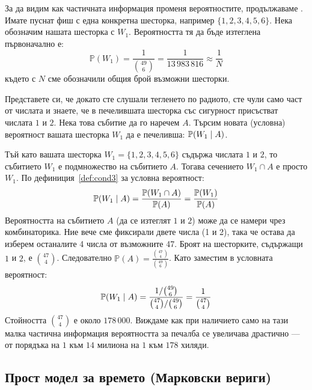 \begin{example}[Тото 6 от 49]\label{ex:03-1}

За да видим как частичната информация променя вероятностите, продължаваме . Имате пуснат фиш с една конкретна шесторка, например $\{1, 2, 3, 4, 5, 6\}$. Нека обозначим нашата шесторка с $W_1$.
Вероятността тя да бъде изтеглена първоначално е:
\[
\mathbb{P}(W_1) = \frac{1}{\binom{49}{6}} = \frac{1}{13\,983\,816} \approx \frac{1}{N}
\]
където с $N$ сме обозначили общия брой възможни шесторки.

Представете си, че докато сте слушали тегленето по радиото, сте чули само част от числата и знаете, че в печелившата шесторка със сигурност присъстват числата $1$ и $2$. Нека това събитие да го наречем $A$. Търсим новата (условна) вероятност вашата шесторка $W_1$ да е печеливша: $\mathbb{P}(W_1 \mid A)$.

Тъй като вашата шесторка $W_1 = \{1, 2, 3, 4, 5, 6\}$ съдържа числата $1$ и $2$, то събитието $W_1$ е подмножество на събитието $A$. Тогава сечението $W_1 \cap A$ е просто $W_1$.
По дефиниция~\ref{def:cond3} за условна вероятност:
\[
\mathbb{P}(W_1 \mid A) = \frac{\mathbb{P}(W_1 \cap A)}{\mathbb{P}(A)} = \frac{\mathbb{P}(W_1)}{\mathbb{P}(A)}
\]
Вероятността на събитието $A$ (да се изтеглят $1$ и $2$) може да се намери чрез комбинаторика. Ние вече сме фиксирали двете числа (1 и 2), така че остава да изберем останалите 4 числа от възможните 47. Броят на шесторките, съдържащи $1$ и $2$, е $\binom{47}{4}$.
Следователно $\mathbb{P}(A) = \frac{\binom{47}{4}}{\binom{49}{6}}$. Като заместим в условната вероятност:
\[
\mathbb{P}(W_1 \mid A) = \frac{1 / \binom{49}{6}}{\binom{47}{4} / \binom{49}{6}} = \frac{1}{\binom{47}{4}}
\]
Стойността $\binom{47}{4}$ е около $178\,000$. Виждаме как при наличието само на тази малка частична информация вероятността за печалба се увеличава драстично — от порядъка на $1$ към $14$ милиона на $1$ към $178$ хиляди.

\end{example}

\subsection{Прост модел за времето (Марковски вериги)}

